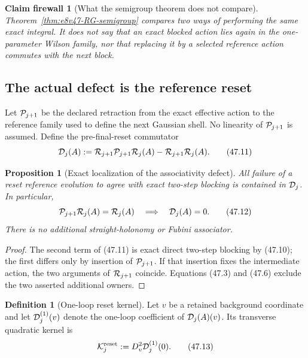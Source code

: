 \documentclass[11pt,oneside]{book}
\newtheorem{proposition}[theorem]{Proposition}
\newtheorem{firewall}[theorem]{Claim firewall}
\theoremstyle{definition}
\newtheorem{definition}[theorem]{Definition}
\theoremstyle{remark}
\begin{document}
\begin{firewall}[What the semigroup theorem does not compare]
\label{fire:e8v47-semigroup-scope}
Theorem~\ref{thm:e8v47-RG-semigroup} compares two ways of performing
the same exact integral.  It does not say that an exact blocked
action lies again in the one-parameter Wilson family, nor that
replacing it by a selected reference action commutes with the next
block.
\end{firewall}

\subsection{The actual defect is the reference reset}

Let \({\cal P}_{j+1}\) be the declared retraction from the exact
effective action to the reference family used to define the next
Gaussian shell.  No linearity of \({\cal P}_{j+1}\) is assumed.
Define the pre-final-reset commutator
\[
 {\cal D}_j(A)
 :={\cal R}_{j+1}{\cal P}_{j+1}{\cal R}_j(A)
   -{\cal R}_{j+1}{\cal R}_j(A).                              \tag{47.11}
\]

\begin{proposition}[Exact localization of the associativity defect]
\label{prop:e8v47-reset-owner}
All failure of a reset reference evolution to agree with exact
two-step blocking is contained in \({\cal D}_j\).  In particular,
\[
 {\cal P}_{j+1}{\cal R}_j(A)={\cal R}_j(A)
 \quad\Longrightarrow\quad {\cal D}_j(A)=0.                   \tag{47.12}
\]
There is no additional straight-holonomy or Fubini associator.
\end{proposition}

\begin{proof}
The second term of (47.11) is exact direct two-step blocking by
(47.10); the first differs only by insertion of
\({\cal P}_{j+1}\).  If that insertion fixes the intermediate
action, the two arguments of \({\cal R}_{j+1}\) coincide.
Equations (47.3) and (47.6) exclude the two asserted additional
owners.
\end{proof}

\begin{definition}[One-loop reset kernel]
\label{def:e8v47-reset-kernel}
Let \(v\) be a retained background coordinate and let
\({\cal D}^{(1)}_j(v)\) denote the one-loop coefficient of
\({\cal D}_j(A)(v)\).  Its transverse quadratic kernel is
\[
 {\cal K}^{\rm reset}_j
 :=D_v^2{\cal D}^{(1)}_j(0).                                  \tag{47.13}
\]
\end{definition}
\end{document}
